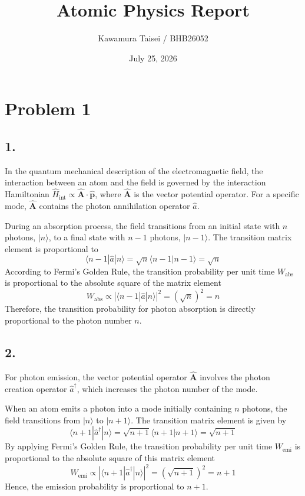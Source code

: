 \documentclass[11pt,a4paper]{article}
\title{Atomic Physics Report}
\author{Kawamura Taisei / BHB26052}
\date{July 25, 2026}
\begin{document}
\maketitle

\section*{Problem 1}

\subsection*{1.}
In the quantum mechanical description of the electromagnetic field, the interaction between an atom and the field is governed by the interaction Hamiltonian $\hat{H}_{\text{int}} \propto \hat{\mathbf{A}} \cdot \hat{\mathbf{p}}$, where $\hat{\mathbf{A}}$ is the vector potential operator. For a specific mode, $\hat{\mathbf{A}}$ contains the photon annihilation operator $\hat{a}$.

During an absorption process, the field transitions from an initial state with $n$ photons, $|n\rangle$, to a final state with $n-1$ photons, $|n-1\rangle$. The transition matrix element is proportional to
\[
\langle n-1 | \hat{a} | n \rangle = \sqrt{n} \langle n-1 | n-1 \rangle = \sqrt{n}
\]
According to Fermi's Golden Rule, the transition probability per unit time $W_{\text{abs}}$ is proportional to the absolute square of the matrix element
\[
W_{\text{abs}} \propto \left| \langle n-1 | \hat{a} | n \rangle \right|^2 = (\sqrt{n})^2 = n
\]
Therefore, the transition probability for photon absorption is directly proportional to the photon number $n$.

\subsection*{2.}
For photon emission, the vector potential operator $\hat{\mathbf{A}}$ involves the photon creation operator $\hat{a}^\dagger$, which increases the photon number of the mode.

When an atom emits a photon into a mode initially containing $n$ photons, the field transitions from $|n\rangle$ to $|n+1\rangle$. The transition matrix element is given by
\[
\langle n+1 | \hat{a}^\dagger | n \rangle = \sqrt{n+1} \langle n+1 | n+1 \rangle = \sqrt{n+1}
\]
By applying Fermi's Golden Rule, the transition probability per unit time $W_{\text{emi}}$ is proportional to the absolute square of this matrix element
\[
W_{\text{emi}} \propto \left| \langle n+1 | \hat{a}^\dagger | n \rangle \right|^2 = (\sqrt{n+1})^2 = n+1
\]
Hence, the emission probability is proportional to $n+1$.
\end{document}
